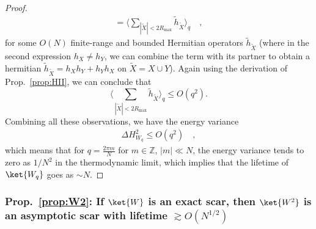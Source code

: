 \documentclass[prx,letterpaper,aps,superscriptaddress,floatfix,twocolumn,nofootinbib]{revtex4-2}
\theoremstyle{definition}
\begin{document}
\begin{proof}
\begin{align}
        = \big\langle \sum_{|\widetilde{X}| < 2R_{\text{max}}} \widetilde{h}_{\widetilde{X}} \big\rangle_q\quad,
    \end{align}
    for some $O(N)$ finite-range and bounded Hermitian operators $\widetilde{h}_{\widetilde{X}}$
    (where in the second expression $h_X \neq h_Y$, we can combine the term with its partner to obtain a hermitian $\widetilde{h}_{\widetilde{X}} = h_X h_Y + h_Y h_X$ on $\widetilde{X} = X \cup Y$).
    Again using the derivation of Prop.~\ref{prop:HII}, we can conclude that
    \begin{equation}
    \big\langle \sum_{|\widetilde{X}| < 2R_{\text{max}}} \widetilde{h}_{\widetilde{X}} \big\rangle_q 
    \leq O(q^2).
    \end{equation}
    Combining all these observations, we have the energy variance
    \begin{align}
        \Delta H_{W_q}^2 \leq O(q^2) \quad,
    \end{align}
    which means that for $q= \frac{2\pi m}{N}$ for $m\in \mathbb{Z}$, $|m| \ll N$, the energy variance tends to zero as $1/N^2$ in the thermodynamic limit, which implies that the lifetime of $\ket{W_q}$ goes as $\sim N$.
\end{proof}

\subsubsection{Prop.~\ref{prop:W2}: If $\ket{W}$ is an exact scar, then $\ket{W^2}$ is an asymptotic scar with lifetime $\gtrsim O(N^{1/2})$}
\label{app:W2}
\end{document}
